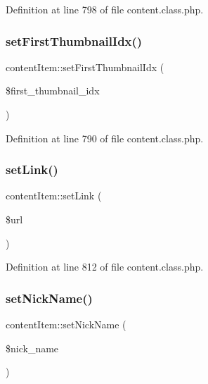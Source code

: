 Definition at line 798 of file content.\+class.\+php.

\hypertarget{classcontentItem_ab18307a6068a6cdde94369976fe730f4}{}\label{classcontentItem_ab18307a6068a6cdde94369976fe730f4} 
\subsubsection{\texorpdfstring{set\+First\+Thumbnail\+Idx()}{setFirstThumbnailIdx()}}
{\footnotesize\ttfamily content\+Item\+::set\+First\+Thumbnail\+Idx (\begin{DoxyParamCaption}\item[{}]{\$first\+\_\+thumbnail\+\_\+idx }\end{DoxyParamCaption})}



Definition at line 790 of file content.\+class.\+php.

\hypertarget{classcontentItem_aad5f15eead8728ad5e2636740c4ff145}{}\label{classcontentItem_aad5f15eead8728ad5e2636740c4ff145} 
\subsubsection{\texorpdfstring{set\+Link()}{setLink()}}
{\footnotesize\ttfamily content\+Item\+::set\+Link (\begin{DoxyParamCaption}\item[{}]{\$url }\end{DoxyParamCaption})}



Definition at line 812 of file content.\+class.\+php.

\hypertarget{classcontentItem_ae3175aa0291e75bf95cb1220e50a33e4}{}\label{classcontentItem_ae3175aa0291e75bf95cb1220e50a33e4} 
\subsubsection{\texorpdfstring{set\+Nick\+Name()}{setNickName()}}
{\footnotesize\ttfamily content\+Item\+::set\+Nick\+Name (\begin{DoxyParamCaption}\item[{}]{\$nick\+\_\+name }\end{DoxyParamCaption})}



